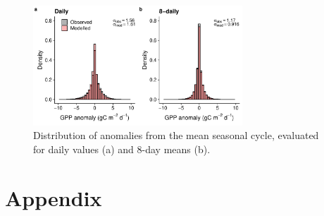 \documentclass{myreport}
\begin{document}
\begin{figure}[!ht]
    \centering
\includegraphics[width=0.7\textwidth]{fig/hist_anomalies.pdf}
    \caption{Distribution of anomalies from the mean seasonal cycle, evaluated for daily values (a) and 8-day means (b).} 
    \label{fig:modobs_anomalies}
\end{figure}

\clearpage


\section{Appendix}
\end{document}
